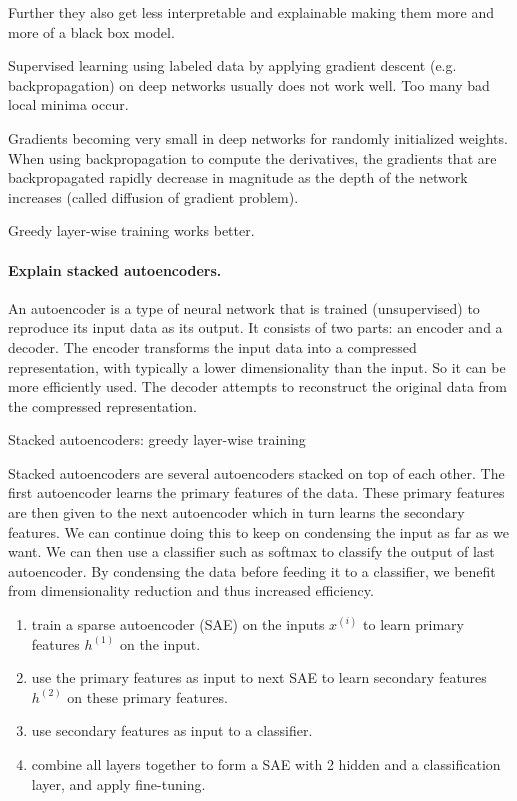 Further they also get less interpretable and explainable making them more and more of a black box model.

Supervised learning using labeled data by applying gradient descent (e.g.
backpropagation) on deep networks usually does not work well. Too
many bad local minima occur.

Gradients becoming very small in deep networks for randomly initialized
weights. When using backpropagation to compute the derivatives, the
gradients that are backpropagated rapidly decrease in magnitude as the
depth of the network increases (called diffusion of gradient problem).

Greedy layer-wise training works better.

\paragraph{Explain stacked autoencoders.}

An autoencoder is a type of neural network that is trained (unsupervised) to reproduce its input data
as its output. It consists of two parts: an encoder and a decoder. The encoder transforms the input
data into a compressed representation, with typically a lower dimensionality than the input. So it can
be more efficiently used. The decoder attempts to reconstruct the original data from the compressed
representation.

Stacked autoencoders: greedy layer-wise training

Stacked autoencoders are several autoencoders stacked on top of each other. The first autoencoder
learns the primary features of the data. These primary features are then given to the next
autoencoder which in turn learns the secondary features. We can continue doing this to keep on
condensing the input as far as we want. We can then use a classifier such as softmax to classify the
output of last autoencoder. By condensing the data before feeding it to a classifier, we benefit from
dimensionality reduction and thus increased efficiency.

\begin{enumerate}
    \item train a sparse autoencoder (SAE) on the inputs $x^{(i)}$ to learn primary features $h^{(1)}$ on the input.
    \item use the primary features as input to next SAE to learn secondary features $h^{(2)}$ on these primary features.
    \item use secondary features as input to a classifier.
    \item combine all layers together to form a SAE with 2 hidden and a classification layer, and apply fine-tuning.
\end{enumerate}

